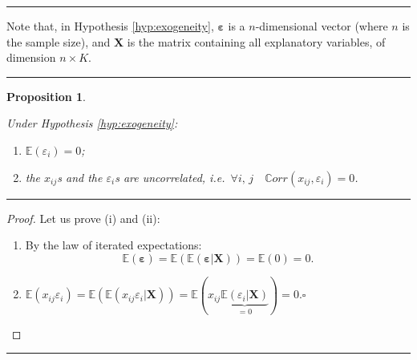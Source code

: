 \documentclass[
]{book}
\providecommand{\tightlist}{%
  \setlength{\itemsep}{0pt}\setlength{\parskip}{0pt}}
\newtheorem{proposition}{Proposition}[chapter]
\theoremstyle{definition}
\theoremstyle{definition}
\theoremstyle{definition}
\theoremstyle{definition}
\theoremstyle{remark}
\begin{document}
\begin{center}\rule{0.5\linewidth}{0.5pt}\end{center}

Note that, in Hypothesis \ref{hyp:exogeneity}, \(\boldsymbol\varepsilon\) is a \(n\)-dimensional vector (where \(n\) is the sample size), and \(\mathbf{X}\) is the matrix containing all explanatory variables, of dimension \(n \times K\).

\begin{center}\rule{0.5\linewidth}{0.5pt}\end{center}

\begin{proposition}
\protect\hypertarget{prp:implicationExog}{}\label{prp:implicationExog}

Under Hypothesis \ref{hyp:exogeneity}:

\begin{enumerate}
\def\labelenumi{\roman{enumi}.}
\item
  \(\mathbb{E}(\varepsilon_{i})=0\);
\item
  the \(x_{ij}\)s and the \(\varepsilon_{i}\)s are uncorrelated, i.e.~\(\forall i,\,j \quad \mathbb{C}orr(x_{ij},\varepsilon_{i})=0\).
\end{enumerate}

\end{proposition}

\begin{center}\rule{0.5\linewidth}{0.5pt}\end{center}

\begin{proof}

Let us prove (i) and (ii):

\begin{enumerate}
\def\labelenumi{\roman{enumi}.}
\tightlist
\item
  By the law of iterated expectations:
  \[
  \mathbb{E}(\boldsymbol\varepsilon)=\mathbb{E}(\mathbb{E}(\boldsymbol\varepsilon|\mathbf{X}))=\mathbb{E}(0)=0.
  \]
\item
  \(\mathbb{E}(x_{ij}\varepsilon_i)=\mathbb{E}(\mathbb{E}(x_{ij}\varepsilon_i|\mathbf{X}))=\mathbb{E}(x_{ij}\underbrace{\mathbb{E}(\varepsilon_i|\mathbf{X})}_{=0})=0\).\(\square\)
\end{enumerate}

\end{proof}

\begin{center}\rule{0.5\linewidth}{0.5pt}\end{center}
\end{document}
